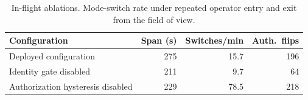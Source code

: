 \begin{table}[t]
\caption{In-flight ablations. Mode-switch rate under repeated operator entry and exit from the field of view.}
\label{tab:ablation}
\centering
\footnotesize
\setlength{\tabcolsep}{4pt}
\renewcommand{\arraystretch}{1.02}
\begin{tabular}{@{}lrrr@{}}
\toprule
Configuration & Span (s) & Switches/min & Auth.\ flips \\
\midrule
Deployed configuration & 275 & 15.7 & 196 \\
Identity gate disabled & 211 & 9.7 & 64 \\
Authorization hysteresis disabled & 229 & 78.5 & 218 \\
\bottomrule
\end{tabular}
\end{table}
